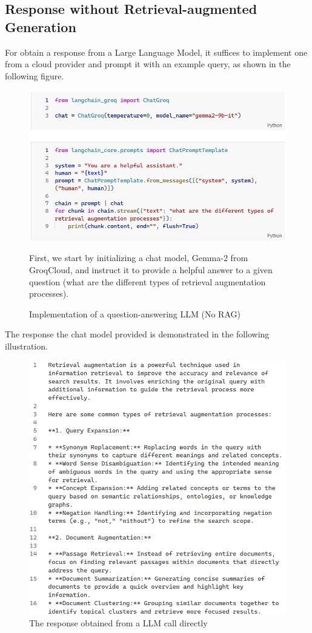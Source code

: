 \subsection{Response without Retrieval-augmented Generation}
For obtain a response from a Large Language Model, it suffices to implement one from a cloud provider and prompt it with an example query, as shown in the following figure.
\begin{figure}[H]
    \centering
    \includegraphics[width=\linewidth]{./figures/code-norag.png}
    \caption{Implementation of a question-answering LLM (No RAG)}
    \begin{flushleft}
        \small First, we start by initializing a chat model, Gemma-2 from GroqCloud, and instruct it to provide a helpful answer to a given question (what are the different types of retrieval augmentation processes).
    \end{flushleft}
\end{figure}
The response the chat model provided is demonstrated in the following illustration.
\begin{figure}[H]
    \centering
    \includegraphics[width=\linewidth]{./figures/answer_norag.png}
    \caption{The response obtained from a LLM call directly}
\end{figure}
